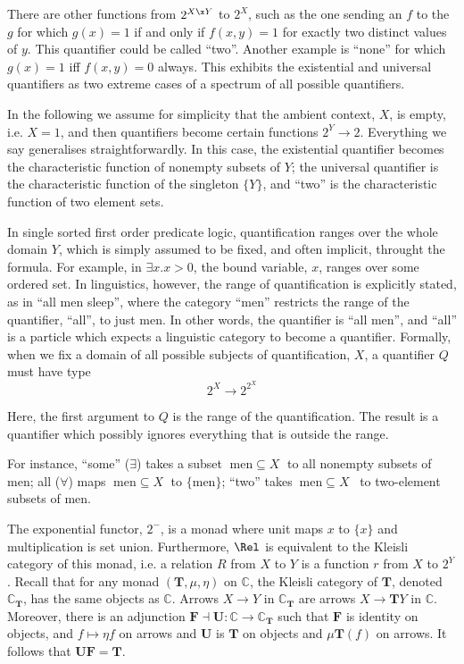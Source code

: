There are other functions from $2^{X\x Y}$ to $2^X$,
such as the one sending an $f$ to the $g$ for which
$g(x) = 1$ if and only if $f(x,y) = 1$ for exactly two distinct values
of $y$. This quantifier could be called ``two''. Another example is
``none'' for which $g(x)=1$ iff $f(x,y) = 0$ always. This exhibits the 
existential and universal quantifiers as two extreme cases of a
spectrum of all possible quantifiers.  

In the following we assume for simplicity that the ambient context,
$X$, is empty, i.e. $X = 1$, and then quantifiers become certain
functions $2^Y \to 2$. Everything we say generalises
straightforwardly.  In this case, the existential quantifier
becomes the characteristic function of nonempty subsets of $Y$; the
universal quantifier is the characteristic function of the singleton
$\{Y\}$, and ``two'' is the characteristic function of two
element sets.

In single sorted first order predicate logic, quantification ranges
over the whole domain $Y$, which is simply assumed to be fixed, and
often implicit, throught the formula. For example, in $\exists x. x >
0$, the bound variable, $x$, ranges over some ordered set. In
linguistics, however, the range of quantification is explicitly
stated, as in ``all men sleep'', where the category ``men'' restricts
the range of the quantifier, ``all'', to just men. In other words, the
quantifier is ``all men'', and ``all'' is a particle which expects a
linguistic category to become a quantifier. Formally, when we fix a
domain of all possible subjects of quantification, $X$, a quantifier
$Q$ must have type
\begin{equation}\label{eq:q}
2^X \to 2^{2^X}
\end{equation}

Here, the first argument to $Q$ is the range of the quantification. The
result is a quantifier which possibly ignores everything that is
outside the range.

For instance, ``some'' ($\exists$) takes a subset
$\;\mathrm{men}\subseteq X\;$ to all nonempty subsets of $\mathrm{men}$; all
($\forall$) maps $\;\mathrm{men}\subseteq X\;$ to $ \{ \mathrm{men}
\}$; ``two'' takes $~\mathrm{men} \subseteq X$~ to two-element subsets of
$\mathrm{men}$.

The exponential functor, $2^-$, is a monad where unit maps $x$ to
$\{x\}$ and multiplication is set union.  Furthermore, $\Rel$ is
equivalent to the Kleisli category of this monad, i.e. a relation $R$
from $X$ to $Y$ is a function $r$ from $X$ to $2^Y$. Recall \cite{CWM}
that for any monad $(\mathbf{T}, \mu, \eta)$ on $\mathbb{C}$, the
Kleisli category of $\mathbf{T}$, denoted $\mathbb{C}_{\mathbf{T}}$,
has the same objects as $\mathbb{C}$. Arrows $X \to Y$ in
$\mathbb{C}_{\mathbf{T}}$ are arrows $X \to \mathbf{T}Y$ in
$\mathbb{C}$. Moreover, there is an adjunction $\mathbf{F} \dashv
\mathbf{U} : \mathbb{C} \to \mathbb{C}_\mathbf{T}$ such that
$\mathbf{F}$ is identity on objects, and $f \mapsto \eta f$ on arrows
and $\mathbf{U}$ is $\mathbf{T}$ on objects and $\mu \mathbf{T}(f)$ on
arrows. It follows that $\mathbf{U}\mathbf{F} = \mathbf{T}$. 

